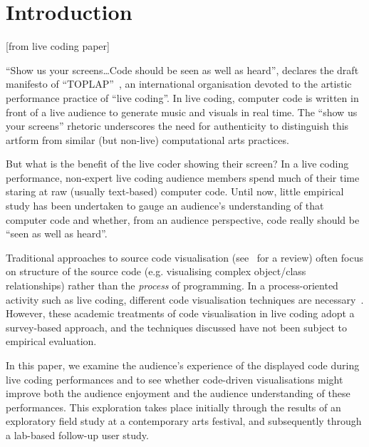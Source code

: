 
\chapter{Introduction}
\label{cha:intro}

[from live coding paper]

``Show us your screens\ldots Code should be seen as well as heard'',
declares the draft manifesto of ``TOPLAP''~\cite{Toplap}, an
international organisation devoted to the artistic performance
practice of ``live coding''. In live coding, computer code is written
in front of a live audience to generate music and visuals in real
time. The ``show us your screens'' rhetoric underscores the need for
authenticity to distinguish this artform from similar (but non-live)
computational arts practices.

But what is the benefit of the live coder showing their screen? In a
live coding performance, non-expert live coding audience members spend
much of their time staring at raw (usually text-based) computer code.
Until now, little empirical study has been undertaken to gauge an
audience's understanding of that computer code and whether, from an
audience perspective, code really should be ``seen as well as heard''.

Traditional approaches to source code visualisation
(see~\cite{Novais2013} for a review) often focus on structure of the
source code (e.g. visualising complex object/class relationships)
rather than the \emph{process} of programming. In a process-oriented
activity such as live coding, different code visualisation techniques
are necessary~\cite{McLean2010b,Magnusson2013}. However, these
academic treatments of code visualisation in live coding adopt a
survey-based approach, and the techniques discussed have not been
subject to empirical evaluation.

In this paper, we examine the audience's experience of the displayed
code during live coding performances and to see whether code-driven
visualisations might improve both the audience enjoyment and the
audience understanding of these performances. This exploration takes
place initially through the results of an exploratory field study at a
contemporary arts festival, and subsequently through a lab-based
follow-up user study.






